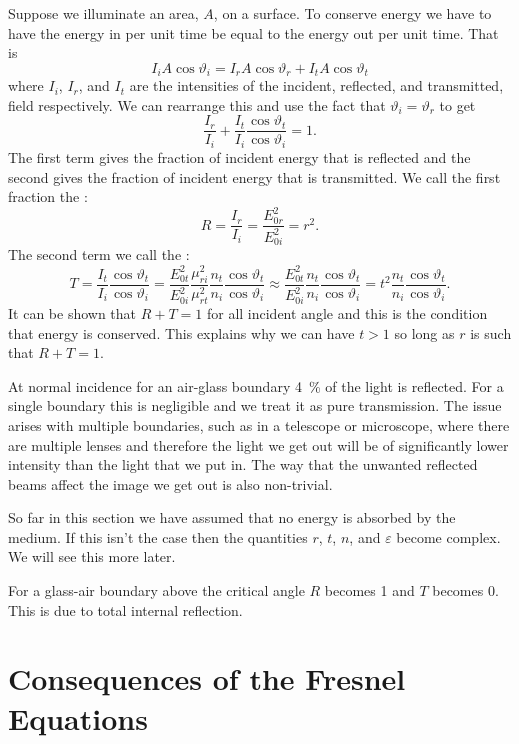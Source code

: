     Suppose we illuminate an area, \(A\), on a surface.
    To conserve energy we have to have the energy in per unit time be equal to the energy out per unit time.
    That is
    \[I_iA\cos\vartheta_i = I_rA\cos\vartheta_r + I_tA\cos\vartheta_t\]
    where \(I_i\), \(I_r\), and \(I_t\) are the intensities of the incident, reflected, and transmitted, field respectively.
    We can rearrange this and use the fact that \(\vartheta_i = \vartheta_r\) to get
    \[\frac{I_r}{I_i} + \frac{I_t}{I_i} \frac{\cos\vartheta_t}{\cos\vartheta_i} = 1.\]
    The first term gives the fraction of incident energy that is reflected and the second gives the fraction of incident energy that is transmitted.
    We call the first fraction the :
    \[R = \frac{I_r}{I_i} = \frac{E_{0r}^2}{E_{0i}^2} = r^2.\]
    The second term we call the :
    \[T = \frac{I_t}{I_i}\frac{\cos\vartheta_t}{\cos\vartheta_i} = \frac{E_{0t}^2}{E_{0i}^2} \frac{\mu_{ri}^2}{\mu_{rt}^2}\frac{n_t}{n_i}\frac{\cos\vartheta_t}{\cos\vartheta_i} \approx \frac{E_{0t}^2}{E_{0i}^2}\frac{n_t}{n_i}\frac{\cos\vartheta_t}{\cos\vartheta_i} = t^2\frac{n_t}{n_i}\frac{\cos\vartheta_t}{\cos\vartheta_i}.\]
    It can be shown that \(R + T = 1\) for all incident angle and this is the condition that energy is conserved.
    This explains why we can have \(t > 1\) so long as \(r\) is such that \(R +  T = 1\).
    
    At normal incidence for an air-glass boundary \SI{4}{\percent} of the light is reflected.
    For a single boundary this is negligible and we treat it as pure transmission.
    The issue arises with multiple boundaries, such as in a telescope or microscope, where there are multiple lenses and therefore the light we get out will be of significantly lower intensity than the light that we put in.
    The way that the unwanted reflected beams affect the image we get out is also non-trivial.
    
    So far in this section we have assumed that no energy is absorbed by the medium.
    If this isn't the case then the quantities \(r\), \(t\), \(n\), and \(\varepsilon\) become complex.
    We will see this more later.
    
    For a glass-air boundary above the critical angle \(R\) becomes 1 and \(T\) becomes 0.
    This is due to total internal reflection.
    
    \section{Consequences of the Fresnel Equations}
